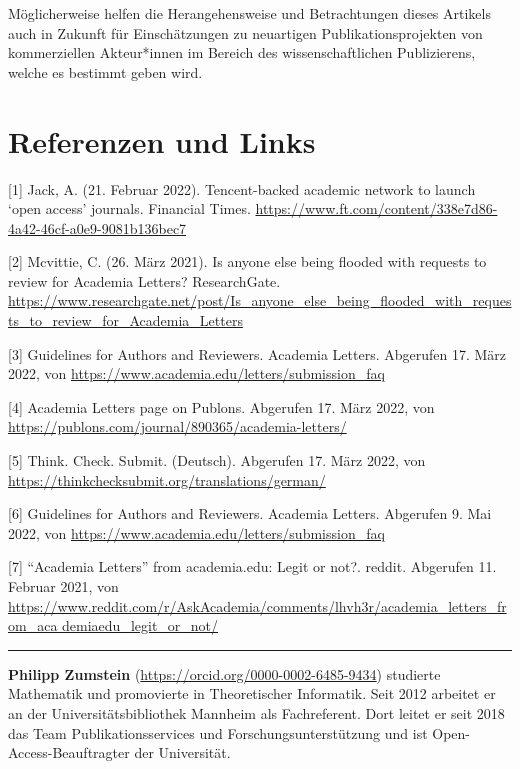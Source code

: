 \documentclass[a4paper,
fontsize=11pt,
oneside,
numbers=noperiodatend,
parskip=half-,
bibliography=totoc,
final
]{scrartcl}
\begin{document}
Möglicherweise helfen die Herangehensweise und Betrachtungen dieses
Artikels auch in Zukunft für Einschätzungen zu neuartigen
Publikationsprojekten von kommerziellen Akteur*innen im Bereich des
wissenschaftlichen Publizierens, welche es bestimmt geben wird.

\hypertarget{referenzen-und-links}{%
\section{Referenzen und Links}\label{referenzen-und-links}}

{[}1{]} Jack, A. (21. Februar 2022). Tencent-backed academic network to
launch \enquote*{open access} journals. Financial Times.
\url{https://www.ft.com/content/338e7d86-4a42-46cf-a0e9-9081b136bec7}

{[}2{]} Mcvittie, C. (26. März 2021). Is anyone else being flooded with
requests to review for Academia Letters? ResearchGate.
\url{https://www.researchgate.net/post/Is_anyone_else_being_flooded_with_requests_to_review_for_Academia_Letters}

{[}3{]} Guidelines for Authors and Reviewers. Academia Letters.
Abgerufen 17. März 2022, von
\url{https://www.academia.edu/letters/submission_faq}

{[}4{]} Academia Letters page on Publons. Abgerufen 17. März 2022, von
\url{https://publons.com/journal/890365/academia-letters/}

{[}5{]} Think. Check. Submit. (Deutsch). Abgerufen 17. März 2022, von
\url{https://thinkchecksubmit.org/translations/german/}

{[}6{]} Guidelines for Authors and Reviewers. Academia Letters.
Abgerufen 9. Mai 2022, von
\url{https://www.academia.edu/letters/submission_faq}

{[}7{]} \enquote{Academia Letters} from academia.edu: Legit or not?.
reddit. Abgerufen 11. Februar 2021, von
\href{https://www.reddit.com/r/AskAcademia/comments/lhvh3r/academia_letters_from_academiaedu_legit_or_not/}{https://www.reddit.com/r/AskAcademia/comments/lhvh3r/academia\_letters\_from\_aca demiaedu\_legit\_or\_not/}

\begin{center}\rule{0.5\linewidth}{0.5pt}\end{center}

\textbf{Philipp Zumstein} (\url{https://orcid.org/0000-0002-6485-9434})
studierte Mathematik und promovierte in Theoretischer Informatik. Seit
2012 arbeitet er an der Universitätsbibliothek Mannheim als
Fachreferent. Dort leitet er seit 2018 das Team Publikationsservices und
Forschungsunterstützung und ist Open-Access-Beauftragter der
Universität.
\end{document}
